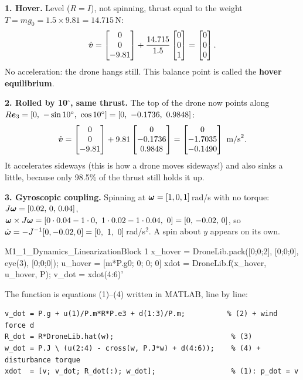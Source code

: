 \begin{toy}[hover, a 10 degree tilt, and gyroscopic coupling ($m=1.5$\,kg, $J=\diag(0.02,0.02,0.04)$)]
\textbf{1. Hover.} Level ($R=I$), not spinning, thrust equal to the weight $T=mg_0=1.5\times9.81=14.715$\,N:
\[
\dot{\bm{v}}=\begin{bmatrix}0\\0\\-9.81\end{bmatrix}+\frac{14.715}{1.5}\begin{bmatrix}0\\0\\1\end{bmatrix}=\begin{bmatrix}0\\0\\0\end{bmatrix}.
\]
No acceleration: the drone hangs still. This balance point is called the \textbf{hover equilibrium}.

\textbf{2. Rolled by 10$^\circ$, same thrust.} The top of the drone now points along
$R\ve_3=[0,\ -\sin10^\circ,\ \cos10^\circ]=[0,\ -0.1736,\ 0.9848]$:
\[
\dot{\bm{v}}=\begin{bmatrix}0\\0\\-9.81\end{bmatrix}+9.81\begin{bmatrix}0\\-0.1736\\0.9848\end{bmatrix}=\begin{bmatrix}0\\-1.7035\\-0.1490\end{bmatrix}\text{ m/s}^2 .
\]
It accelerates sideways (this is how a drone moves sideways!) and also sinks a little, because only 98.5\% of the
thrust still holds it up.

\textbf{3. Gyroscopic coupling.} Spinning at $\bm{\omega}=[1,0,1]$\,rad/s with no torque:
$J\bm{\omega}=[0.02,\,0,\,0.04]$, $\vw\times J\vw=[0\cdot0.04-1\cdot0,\ 1\cdot0.02-1\cdot0.04,\ 0]=[0,\,-0.02,\,0]$, so
$\dot\vw=-J^{-1}[0,-0.02,0]=[0,\ 1,\ 0]$\,rad/s$^2$. A spin about $y$ appears on its own.
\end{toy}

\begin{toycode}{M1\_1\_Dynamics\_Linearization}{Block 1}
x_hover = DroneLib.pack([0;0;2], [0;0;0], eye(3), [0;0;0]);
u_hover = [m*P.g0; 0; 0; 0]          %
xdot  = DroneLib.f(x_hover, u_hover, P);
v_dot = xdot(4:6)'                   %
\end{toycode}
The function  is equations (1)--(4) written in MATLAB, line by line:
\begin{lstlisting}[style=mat, title={\small\sffamily toy\_model3/DroneLib.m, function f}]
v_dot = P.g + u(1)/P.m*R*P.e3 + d(1:3)/P.m;          % (2) + wind force d
R_dot = R*DroneLib.hat(w);                            % (3)
w_dot = P.J \ (u(2:4) - cross(w, P.J*w) + d(4:6));    % (4) + disturbance torque
xdot  = [v; v_dot; R_dot(:); w_dot];                  % (1): p_dot = v
\end{lstlisting}

